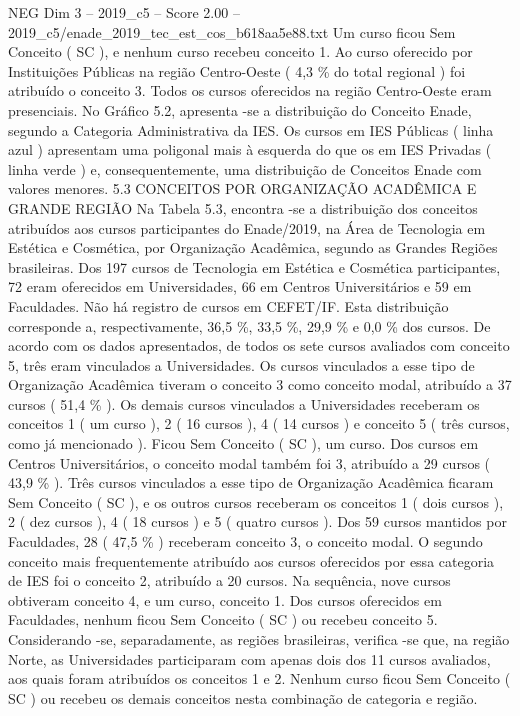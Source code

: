 \begin{textsample}{NEG Dim 3 – 2019\_c5 – Score 2.00 – 2019\_c5/enade\_2019\_tec\_est\_cos\_b618aa5e88.txt}
Um curso ficou Sem Conceito ( SC ), e nenhum curso recebeu conceito 1.
Ao curso oferecido por Instituições Públicas na região Centro-Oeste ( 4,3 \% do total regional ) foi atribuído o conceito 3.
Todos os cursos oferecidos na região Centro-Oeste eram presenciais.
No Gráfico 5.2, apresenta -se a distribuição do Conceito Enade, segundo a Categoria Administrativa da IES.
Os cursos em IES Públicas ( linha azul ) apresentam uma poligonal mais à esquerda do que os em IES Privadas ( linha verde ) e, consequentemente, uma distribuição de Conceitos Enade com valores menores. 5.3 CONCEITOS POR ORGANIZAÇÃO ACADÊMICA E GRANDE REGIÃO Na Tabela 5.3, encontra -se a distribuição dos conceitos atribuídos aos cursos participantes do Enade/2019, na Área de Tecnologia em Estética e Cosmética, por Organização Acadêmica, segundo as Grandes Regiões brasileiras.
Dos 197 cursos de Tecnologia em Estética e Cosmética participantes, 72 eram oferecidos em Universidades, 66 em Centros Universitários e 59 em Faculdades.
Não há registro de cursos em CEFET/IF.
Esta distribuição corresponde a, respectivamente, 36,5 \%, 33,5 \%, 29,9 \% e 0,0 \% dos cursos.
De acordo com os dados apresentados, de todos os sete cursos avaliados com conceito 5, três eram vinculados a Universidades.
Os cursos vinculados a esse tipo de Organização Acadêmica tiveram o conceito 3 como conceito modal, atribuído a 37 cursos ( 51,4 \% ).
Os demais cursos vinculados a Universidades receberam os conceitos 1 ( um curso ), 2 ( 16 cursos ), 4 ( 14 cursos ) e conceito 5 ( três cursos, como já mencionado ).
Ficou Sem Conceito ( SC ), um curso.
Dos cursos em Centros Universitários, o conceito modal também foi 3, atribuído a 29 cursos ( 43,9 \% ).
Três cursos vinculados a esse tipo de Organização Acadêmica ficaram Sem Conceito ( SC ), e os outros cursos receberam os conceitos 1 ( dois cursos ), 2 ( dez cursos ), 4 ( 18 cursos ) e 5 ( quatro cursos ).
Dos 59 cursos mantidos por Faculdades, 28 ( 47,5 \% ) receberam conceito 3, o conceito modal.
O segundo conceito mais frequentemente atribuído aos cursos oferecidos por essa categoria de IES foi o conceito 2, atribuído a 20 cursos.
Na sequência, nove cursos obtiveram conceito 4, e um curso, conceito 1.
Dos cursos oferecidos em Faculdades, nenhum ficou Sem Conceito ( SC ) ou recebeu conceito 5.
Considerando -se, separadamente, as regiões brasileiras, verifica -se que, na região Norte, as Universidades participaram com apenas dois dos 11 cursos avaliados, aos quais foram atribuídos os conceitos 1 e 2.
Nenhum curso ficou Sem Conceito ( SC ) ou recebeu os demais conceitos nesta combinação de categoria e região.

\end{textsample}
